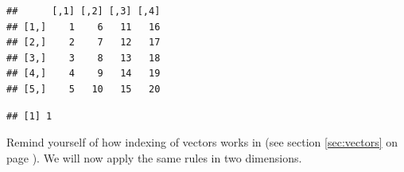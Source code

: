 \documentclass[krantz2]{krantz}\usepackage{knitr}%
\begin{document}
\begin{knitrout}\footnotesize
{}\color{fgcolor}\begin{kframe}
\begin{alltt}
 \hlkwb{<-} \hlstd{(}\hlopt{:}\hlstd{,}  \hlstd{=} \hlstd{)}
\end{alltt}
\begin{verbatim}
##      [,1] [,2] [,3] [,4]
## [1,]    1    6   11   16
## [2,]    2    7   12   17
## [3,]    3    8   13   18
## [4,]    4    9   14   19
## [5,]    5   10   15   20
\end{verbatim}
\begin{alltt}
\hlstd{A[}\hlstd{,} \hlstd{]}
\end{alltt}
\begin{verbatim}
## [1] 1
\end{verbatim}
\end{kframe}
\end{knitrout}

Remind yourself of how indexing of vectors works in \Rlang (see section \ref{sec:vectors} on page \pageref{sec:vectors}). We will now apply the same rules in two dimensions.
\end{document}
